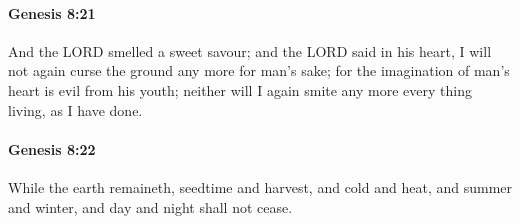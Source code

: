 		\paragraph{Genesis 8:21} %
			\label{GENESIS-8-21}

			And the LORD smelled a sweet savour; and the LORD said in his heart, I will not again curse the ground any more for man's sake; for the imagination of man's heart is evil from his youth; neither will I again smite any more every thing living, as I have done.


		\paragraph{Genesis 8:22} %
			\label{GENESIS-8-22}

			While the earth remaineth, seedtime and harvest, and cold and heat, and summer and winter, and day and night shall not cease.

